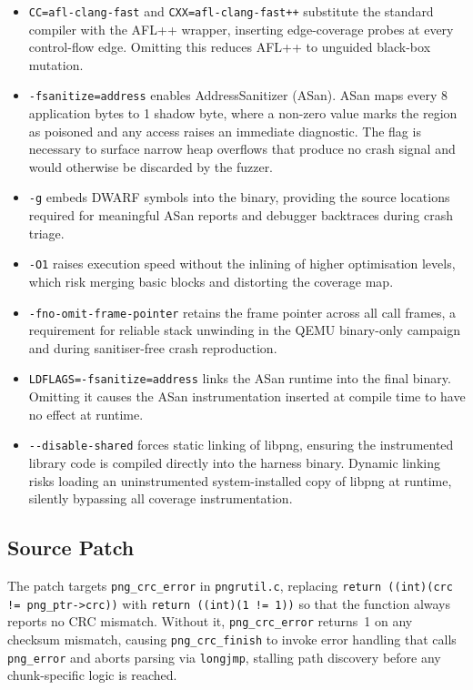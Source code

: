 \documentclass[letterpaper,twocolumn,10pt]{article}
\begin{document}
\begin{itemize}[leftmargin=*]

    \item \lstinline|CC=afl-clang-fast| and \lstinline|CXX=afl-clang-fast++| substitute the standard compiler with the AFL++ wrapper, inserting edge-coverage probes at every control-flow edge. Omitting this reduces AFL++ to unguided black-box mutation.

    \item \lstinline|-fsanitize=address| enables AddressSanitizer (ASan). ASan maps every 8 application bytes to 1 shadow byte, where a non-zero value marks the region as poisoned and any access raises an immediate diagnostic. The flag is necessary to surface narrow heap overflows that produce no crash signal and would otherwise be discarded by the fuzzer.

    \item \lstinline|-g| embeds DWARF symbols into the binary, providing the source locations required for meaningful ASan reports and debugger backtraces during crash triage.

    \item \lstinline|-O1| raises execution speed without the inlining of higher optimisation levels, which risk merging basic blocks and distorting the coverage map.

    \item \lstinline|-fno-omit-frame-pointer| retains the frame pointer across all call frames, a requirement for reliable stack unwinding in the QEMU binary-only campaign and during sanitiser-free crash reproduction.

    \item \lstinline|LDFLAGS=-fsanitize=address| links the ASan runtime into the final binary. Omitting it causes the ASan instrumentation inserted at compile time to have no effect at runtime.

    \item \lstinline|--disable-shared| forces static linking of libpng, ensuring the instrumented library code is compiled directly into the harness binary. Dynamic linking risks loading an uninstrumented system-installed copy of libpng at runtime, silently bypassing all coverage instrumentation.

\end{itemize}

\subsection{Source Patch}
The patch targets \lstinline|png_crc_error| in \lstinline|pngrutil.c|, replacing \lstinline|return ((int)(crc != png_ptr->crc))| with \lstinline|return ((int)(1 != 1))| so that the function always reports no CRC mismatch. Without it, \lstinline|png_crc_error| returns~1 on any checksum mismatch, causing \lstinline|png_crc_finish| to invoke error handling that calls \lstinline|png_error| and aborts parsing via \lstinline|longjmp|, stalling path discovery before any chunk-specific logic is reached.
\end{document}
